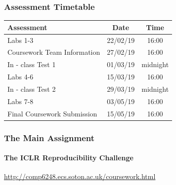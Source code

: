 \documentclass[\beamerclass]{beamer}
\begin{document}
\begin{frame}
	\frametitle{Assessment Timetable}
	
	\begin{center}
	\begin{tabular}{ l c  c}
		 Assessment & Date  & Time\\ \hline
		 Labs 1-3  &  22/02/19 & 16:00 \\ 
		 Coursework Team Information & 27/02/19 & 16:00 \\
		 In - class Test 1 & 01/03/19 & midnight  \\		 
		 Labs 4-6  & 15/03/19 & 16:00 \\  
		 In - class Test 2 & 29/03/19 & midnight  \\		 
		 Labs 7-8 & 03/05/19 & 16:00   \\
		 Final Coursework Submission & 15/05/19 & 16:00 \\
	\end{tabular}
	\end{center}
	
\end{frame}

\begin{frame}
	\frametitle{The Main Assignment}
	\framesubtitle{The ICLR Reproducibility Challenge}
	\url{http://comp6248.ecs.soton.ac.uk/coursework.html}
	
\end{frame}
\end{document}
